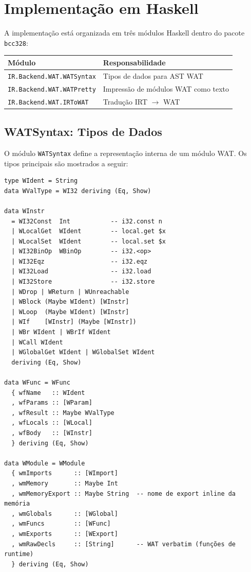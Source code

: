 \section{Implementação em Haskell}\label{sec:wat-haskell}

A implementação está organizada em três módulos Haskell dentro do pacote
\texttt{bcc328}:

\begin{center}
\begin{tabular}{ll}
\hline
\textbf{Módulo} & \textbf{Responsabilidade} \\
\hline
\texttt{IR.Backend.WAT.WATSyntax} & Tipos de dados para AST WAT \\
\texttt{IR.Backend.WAT.WATPretty} & Impressão de módulos WAT como texto \\
\texttt{IR.Backend.WAT.IRToWAT}   & Tradução IRT $\to$ WAT \\
\hline
\end{tabular}
\end{center}

\subsection{WATSyntax: Tipos de Dados}

O módulo \texttt{WATSyntax} define a representação interna de um módulo WAT.
Os tipos principais são mostrados a seguir:

\begin{verbatim}
type WIdent = String
data WValType = WI32 deriving (Eq, Show)

data WInstr
  = WI32Const  Int           -- i32.const n
  | WLocalGet  WIdent        -- local.get $x
  | WLocalSet  WIdent        -- local.set $x
  | WI32BinOp  WBinOp        -- i32.<op>
  | WI32Eqz                  -- i32.eqz
  | WI32Load                 -- i32.load
  | WI32Store                -- i32.store
  | WDrop | WReturn | WUnreachable
  | WBlock (Maybe WIdent) [WInstr]
  | WLoop  (Maybe WIdent) [WInstr]
  | WIf    [WInstr] (Maybe [WInstr])
  | WBr WIdent | WBrIf WIdent
  | WCall WIdent
  | WGlobalGet WIdent | WGlobalSet WIdent
  deriving (Eq, Show)

data WFunc = WFunc
  { wfName   :: WIdent
  , wfParams :: [WParam]
  , wfResult :: Maybe WValType
  , wfLocals :: [WLocal]
  , wfBody   :: [WInstr]
  } deriving (Eq, Show)

data WModule = WModule
  { wmImports      :: [WImport]
  , wmMemory       :: Maybe Int
  , wmMemoryExport :: Maybe String  -- nome de export inline da memória
  , wmGlobals      :: [WGlobal]
  , wmFuncs        :: [WFunc]
  , wmExports      :: [WExport]
  , wmRawDecls     :: [String]      -- WAT verbatim (funções de runtime)
  } deriving (Eq, Show)
\end{verbatim}

